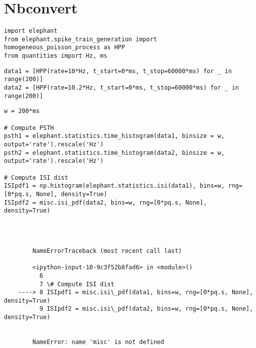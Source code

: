     \section{Nbconvert}\label{nbconvert}
%
\begin{lstlisting}
import elephant
from elephant.spike_train_generation import homogeneous_poisson_process as HPP
from quantities import Hz, ms
\end{lstlisting}%
\begin{lstlisting}
data1 = [HPP(rate=10*Hz, t_start=0*ms, t_stop=60000*ms) for _ in range(200)]
data2 = [HPP(rate=10.2*Hz, t_start=0*ms, t_stop=60000*ms) for _ in range(200)]
\end{lstlisting}%
\begin{lstlisting}
w = 200*ms

# Compute PSTH
psth1 = elephant.statistics.time_histogram(data1, binsize = w, output='rate').rescale('Hz')
psth2 = elephant.statistics.time_histogram(data2, binsize = w, output='rate').rescale('Hz')

# Compute ISI dist
ISIpdf1 = np.histogram(elephant.statistics.isi(data1), bins=w, rng=[0*pq.s, None], density=True)
ISIpdf2 = misc.isi_pdf(data2, bins=w, rng=[0*pq.s, None], density=True)
\end{lstlisting}%
    \begin{Verbatim}[commandchars=\\\{\}]

        

        NameErrorTraceback (most recent call last)

        <ipython-input-10-9c3f52b8fad6> in <module>()
          6 
          7 \# Compute ISI dist
    ----> 8 ISIpdf1 = misc.isi\_pdf(data1, bins=w, rng=[0*pq.s, None], density=True)
          9 ISIpdf2 = misc.isi\_pdf(data2, bins=w, rng=[0*pq.s, None], density=True)


        NameError: name 'misc' is not defined

    \end{Verbatim}
%
